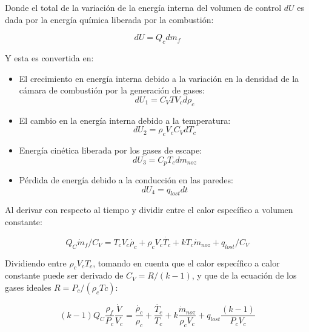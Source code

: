 \documentclass[12pt]{article}
\begin{document}
Donde el total de la variación de la energía interna del volumen de control $dU$ es dada por la energía química liberada por la combustión:

\begin{equation}
  d U=Q_{c} d m_{f}
\end{equation}

Y esta es convertida en:

\begin{itemize}
  \item El crecimiento en energía interna debido a la variación en la densidad de la cámara de combustión por la generación de gases:
  \begin{equation}
    d U_{1}=C_{V} T V_{c} d \rho_{c}
  \end{equation}
  \item El cambio en la energía interna debido a la temperatura:
  \begin{equation}
    d U_{2}=\rho_{c} V_{c} C_{V} d T_{c}
  \end{equation}
  \item Energía cinética liberada por los gases de escape:
  \begin{equation}
    d U_{3} = C_{p} T_{c} d m_{noz}
  \end{equation}
  \item Pérdida de energía debido a la conducción en las paredes:
  \begin{equation}
    d U_{4}=q_{lost} dt
  \end{equation}
\end{itemize}

Al derivar con respecto al tiempo y dividir entre el calor específico a volumen constante:

\begin{equation}
  Q_{C} \dot{m}_{f} / C_{V} = T_{c} V_{c} \dot{\rho_{c}} + \rho_{c} V_{c} \dot{T_{c}} + k T_{c} \dot{m}_{noz} + q_{lost} / C_{V}
\end{equation}

Dividiendo entre $\rho_{c} V_{c} T_{c}$, tomando en cuenta que el calor específico a calor constante puede ser derivado de $C_{V}=R/(k-1)$, y que de la ecuación de los gases ideales $R = P_{c} / (\rho_{c} T{c})$:

\begin{equation}
  (k-1) Q_{C} \frac{\rho_{f}}{P_{c}} \frac{\dot{V}}{V_{c}} = \frac{\dot{\rho_{c}}}{\rho_{c}} + \frac{\dot{T_{c}}}{T_{c}} + k \frac{\dot{m}_{noz}}{\rho_{c} V_{c}} + q_{lost} \frac{(k-1)}{P_{c} V_{c}}
  \label{temperatura}
\end{equation}
\end{document}
